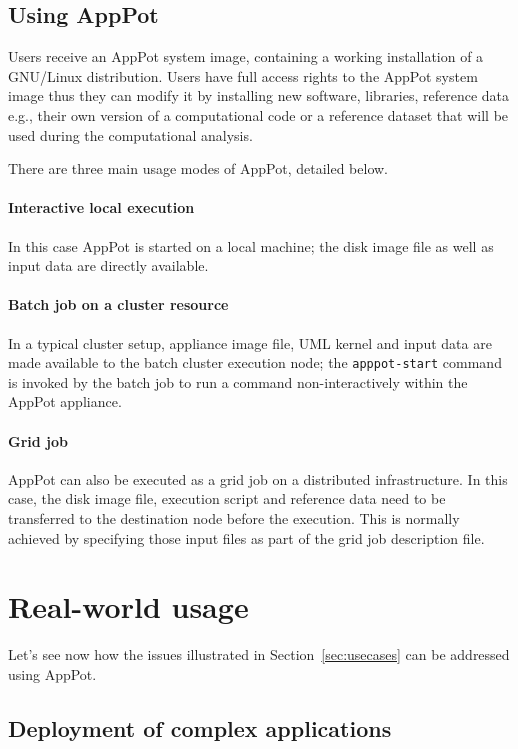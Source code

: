 \documentclass{PoS}
\begin{document}
\subsection{Using AppPot}
\label{sec:using}

Users receive an AppPot system image, containing a working
installation of a GNU/Linux distribution.  
Users have full access rights to the AppPot system image thus they can modify
it by installing new software, libraries, reference data e.g.,
their own version of a computational code or a reference dataset that
will be used during the computational analysis.

There are three main usage modes of AppPot, detailed below.

\paragraph{Interactive local execution} In this case AppPot is
started on a local machine; the disk image file as well as input data are
directly available. 
\paragraph{Batch job on a cluster resource} In a typical cluster
setup, appliance image file, \ac{UML} kernel and input data are made
available to the batch cluster execution node; the
\texttt{apppot-start} command is invoked by the batch job to run a
command non-interactively within the AppPot appliance.

\paragraph{Grid job} AppPot can also be executed as a grid job on a
distributed infrastructure. In this case, the disk image file,
execution script and reference data need to be transferred to the
destination node before the execution. This is normally achieved by
specifying those input files as part of the grid job description
file. 

\section{Real-world usage}
\label{sec:usage}

Let's see now how the issues illustrated in Section~\ref{sec:usecases}
can be addressed using AppPot.

\subsection{Deployment of complex applications}
\label{sec:usage-deployment}
\end{document}
